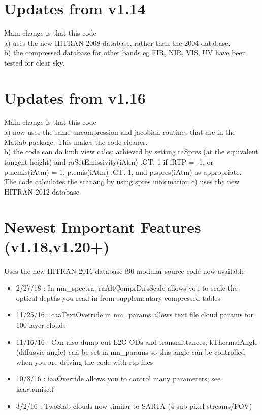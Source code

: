 \documentclass[12pt]{article}
\begin{document}
\section{Updates from v1.14}
Main change is that this code \\
a) uses the new HITRAN 2008 database, rather than the 2004 database,\\
b) the compressed database for other bands eg FIR, NIR, VIS, UV have been tested 
   for clear sky.\\

\section{Updates from v1.16}
Main change is that this code \\
a) now uses the same uncompression and jacobian routines that are in the Matlab
   package. This makes the code cleaner. \\
b) the code can do limb view calcs; achieved by setting raSpres (at the equivalent 
   tangent height) and raSetEmissivity(iAtm) .GT. 1 if iRTP = -1, or 
     p.nemis(iAtm) = 1, p.emis(iAtm) .GT. 1, and p.spres(iAtm) as appropriate.\\
   The code calculates the scanang by using spres information\newline
c) uses the new HITRAN 2012 database

\section{Newest Important Features (v1.18,v1.20+)}
Uses the new HITRAN 2016 database \newline
f90 modular source code now available \newline
\begin{itemize}
\item 2/27/18 : In nm\_spectra, raAltComprDirsScale allows you to scale the
                optical depths you read in from supplementary compressed tables
\item 11/25/16 : caaTextOverride in nm\_params allows text file cloud params for 100
                 layer clouds
\item 11/16/16 : Can also dump out L2G ODs and transmittances; kThermalAngle (diffusvie
                 angle) can be set in nm\_params so this angle can be controlled when
		 you are driving the code with rtp files
\item 10/8/16 : iaaOverride allows you to control many parameters; see kcartamisc.f
\item 3/2/16  : TwoSlab clouds now similar to SARTA (4 sub-pixel streams/FOV)          
\end{itemize}
\end{document}
